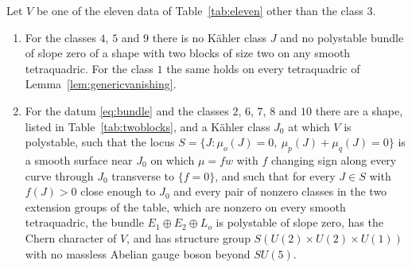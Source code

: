 \begin{theorem}\label{thm:twoblocks}
Let $V$ be one of the eleven data of Table~\ref{tab:eleven} other than the
class $3$.
\begin{enumerate}[label=\textup{(\roman*)},leftmargin=*,itemsep=1pt]
\item For the classes $4$, $5$ and $9$ there is no K\"ahler class $J$ and no
polystable bundle of slope zero of a shape with two blocks of size two on
any smooth tetraquadric. For the class $1$ the same holds on every
tetraquadric of Lemma~\ref{lem:genericvanishing}.
\item For the datum \eqref{eq:bundle} and the classes $2$, $6$, $7$, $8$
and $10$ there are a shape, listed in Table~\ref{tab:twoblocks}, and a
K\"ahler class $J_0$ at which $V$ is polystable, such that the locus
$S=\{J:\mu_o(J)=0,\ \mu_p(J)+\mu_q(J)=0\}$ is a smooth surface near
$J_0$ on which $\mu=fw$ with $f$ changing sign along every curve through
$J_0$ transverse to $\{f=0\}$, and such that for every $J\in S$ with
$f(J)>0$ close enough to $J_0$ and every pair of nonzero classes in the two
extension groups of the table, which are nonzero on every smooth
tetraquadric, the bundle $E_1\oplus E_2\oplus L_o$ is polystable of
slope zero, has the Chern character of $V$, and has structure group
$S(U(2)\times U(2)\times U(1))$ with no massless Abelian gauge boson
beyond $SU(5)$.
\end{enumerate}
\end{theorem}

